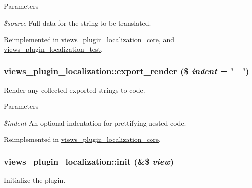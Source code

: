 \begin{DoxyParams}{Parameters}
\item[{\em \$source}]Full data for the string to be translated. \end{DoxyParams}


Reimplemented in \hyperlink{classviews__plugin__localization__core_aab727cab888d512998e318be557813d7}{views\_\-plugin\_\-localization\_\-core}, and \hyperlink{classviews__plugin__localization__test_a1740df329ba25cb81db1cf1a92be9ed8}{views\_\-plugin\_\-localization\_\-test}.\hypertarget{classviews__plugin__localization_ab53c5011e643fd284723970283c25d32}{
\subsubsection[{export\_\-render}]{\setlength{\rightskip}{0pt plus 5cm}views\_\-plugin\_\-localization::export\_\-render (\$ {\em indent} = {\ttfamily '~~'})}}
\label{classviews__plugin__localization_ab53c5011e643fd284723970283c25d32}
Render any collected exported strings to code.


\begin{DoxyParams}{Parameters}
\item[{\em \$indent}]An optional indentation for prettifying nested code. \end{DoxyParams}


Reimplemented in \hyperlink{classviews__plugin__localization__core_a40776fb6a694863bfddc44954d1cb187}{views\_\-plugin\_\-localization\_\-core}.\hypertarget{classviews__plugin__localization_a13d9223bcdd7447518dd44e3d5b5e0f4}{
\subsubsection[{init}]{\setlength{\rightskip}{0pt plus 5cm}views\_\-plugin\_\-localization::init (\&\$ {\em view})}}
\label{classviews__plugin__localization_a13d9223bcdd7447518dd44e3d5b5e0f4}
Initialize the plugin.


